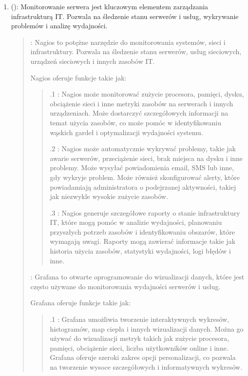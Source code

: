\documentclass[letterpaper,10pt,polish]{sphinxmanual}
\begin{document}
\begin{enumerate}
\item {} 
\sphinxAtStartPar
{} (): Monitorowanie serwera jest kluczowym elementem zarządzania infrastrukturą IT. Pozwala na śledzenie stanu serwerów i usług, wykrywanie problemów i analizę wydajności.
\begin{quote}

 : Nagios to potężne narzędzie do monitorowania systemów, sieci i infrastruktury. Pozwala na śledzenie stanu serwerów, usług sieciowych, urządzeń sieciowych i innych zasobów IT.

\sphinxAtStartPar
Nagios oferuje funkcje takie jak:
\begin{quote}

.1 : Nagios może monitorować zużycie procesora, pamięci, dysku, obciążenie sieci i inne metryki zasobów na serwerach i innych urządzeniach. Może dostarczyć szczegółowych informacji na temat użycia zasobów, co może pomóc w identyfikowaniu wąskich gardeł i optymalizacji wydajności systemu.

.2 : Nagios może automatycznie wykrywać problemy, takie jak awarie serwerów, przeciążenie sieci, brak miejsca na dysku i inne problemy. Może wysyłać powiadomienia e\sphinxhyphen{}mail, SMS lub inne, gdy wykryje problem. Może również skonfigurować alerty, które powiadamiają administratora o podejrzanej aktywności, takiej jak niezwykle wysokie zużycie zasobów.

.3 : Nagios generuje szczegółowe raporty o stanie infrastruktury IT, które mogą pomóc w analizie wydajności, planowaniu przyszłych potrzeb zasobów i identyfikowaniu obszarów, które wymagają uwagi. Raporty mogą zawierać informacje takie jak historia użycia zasobów, statystyki wydajności, logi błędów i inne.
\end{quote}

 : Grafana to otwarte oprogramowanie do wizualizacji danych, które jest często używane do monitorowania wydajności serwerów i usług.

\sphinxAtStartPar
Grafana oferuje funkcje takie jak:
\begin{quote}

.1 : Grafana umożliwia tworzenie interaktywnych wykresów, histogramów, map ciepła i innych wizualizacji danych. Można go używać do wizualizacji metryk takich jak zużycie procesora, pamięci, obciążenie sieci, liczba użytkowników online i inne. Grafana oferuje szeroki zakres opcji personalizacji, co pozwala na tworzenie wysoce szczegółowych i informatywnych wykresów.


\end{quote}
\end{quote}
\end{enumerate}
\end{document}
